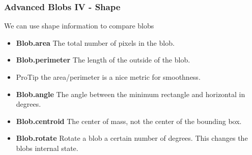 \documentclass[compress]{beamer}
\begin{document}
\begin{frame}
  \frametitle{Advanced Blobs IV - Shape}
We can use shape information to compare blobs
\begin{itemize}
\item \textbf{Blob.area} The total number of pixels in the blob.
\item \textbf{Blob.perimeter} The length of the outside of the blob.
\item ProTip the area/perimeter is a nice metric for smoothness.
\item \textbf{Blob.angle} The angle between the minimum rectangle and
  horizontal in degrees. 
\item \textbf{Blob.centroid} The center of mass, not the center of the
  bounding box.
\item \textbf{Blob.rotate} Rotate a blob a certain number of
  degrees. This changes the blobs internal state. 

\end{itemize}
\end{frame}
\end{document}
